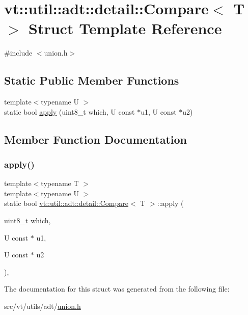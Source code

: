 \hypertarget{structvt_1_1util_1_1adt_1_1detail_1_1_compare_3_01_t_01_4}{}\section{vt\+:\+:util\+:\+:adt\+:\+:detail\+:\+:Compare$<$ T $>$ Struct Template Reference}
\label{structvt_1_1util_1_1adt_1_1detail_1_1_compare_3_01_t_01_4}


{\ttfamily \#include $<$union.\+h$>$}

\subsection*{Static Public Member Functions}
\begin{DoxyCompactItemize}
\item 
{\footnotesize template$<$typename U $>$ }\\static bool \hyperlink{structvt_1_1util_1_1adt_1_1detail_1_1_compare_3_01_t_01_4_ad9822385afdcf17b9a5b098148b8d87e}{apply} (uint8\+\_\+t which, U const $\ast$u1, U const $\ast$u2)
\end{DoxyCompactItemize}


\subsection{Member Function Documentation}
\mbox{\label{structvt_1_1util_1_1adt_1_1detail_1_1_compare_3_01_t_01_4_ad9822385afdcf17b9a5b098148b8d87e}} 
\subsubsection{\texorpdfstring{apply()}{apply()}}
{\footnotesize\ttfamily template$<$typename T $>$ \\
template$<$typename U $>$ \\
static bool \hyperlink{structvt_1_1util_1_1adt_1_1detail_1_1_compare}{vt\+::util\+::adt\+::detail\+::\+Compare}$<$ T $>$\+::apply (\begin{DoxyParamCaption}\item[{uint8\+\_\+t}]{which,  }\item[{U const $\ast$}]{u1,  }\item[{U const $\ast$}]{u2 }\end{DoxyParamCaption})\hspace{0.3cm}{\ttfamily [inline]}, {\ttfamily [static]}}



The documentation for this struct was generated from the following file\+:\begin{DoxyCompactItemize}
\item 
src/vt/utils/adt/\hyperlink{union_8h}{union.\+h}\end{DoxyCompactItemize}

